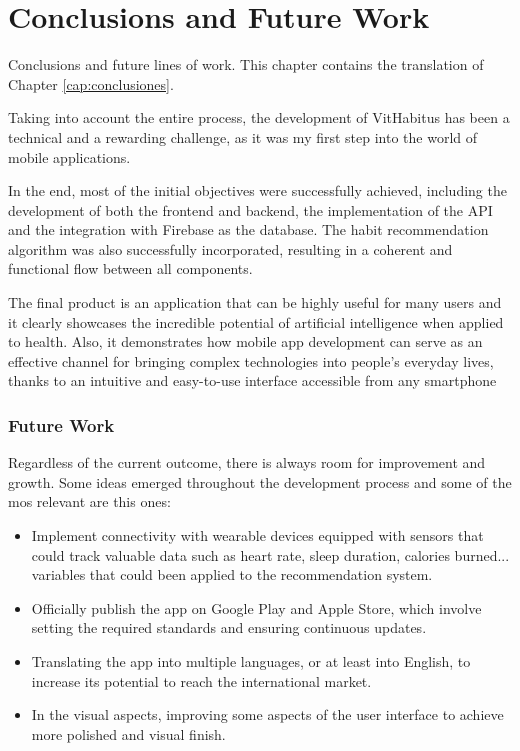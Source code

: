 \chapter*{Conclusions and Future Work}
\label{cap:conclusions}

Conclusions and future lines of work. This chapter contains the translation of Chapter \ref{cap:conclusiones}.

Taking into account the entire process, the development of VitHabitus has been a technical and a rewarding challenge, as it was my first step into the world of mobile applications.

In the end, most of the initial objectives were successfully achieved, including the development of both the frontend and backend, the implementation of the API and the integration with Firebase as the database. The habit recommendation algorithm was also successfully incorporated, resulting in a coherent and functional flow between all components.

The final product is an application that can be highly useful for many users and it clearly showcases the incredible potential of artificial intelligence when applied to health. Also, it demonstrates how mobile app development can serve as an effective channel for bringing complex technologies into people's everyday lives, thanks to an intuitive and easy-to-use interface accessible from any smartphone

\subsection*{Future Work}

Regardless of the current outcome, there is always room for improvement and growth.
Some ideas emerged throughout the development process and some of the mos relevant are this ones:
\begin{itemize}
    \item Implement connectivity with wearable devices equipped with sensors that could track valuable data such as heart rate, sleep duration, calories burned... variables that could been applied to the recommendation system.
    \item Officially publish the app on Google Play and Apple Store, which involve setting the required standards and ensuring continuous updates.
    \item Translating the app into multiple languages, or at least into English, to increase its potential to reach the international market.
    \item In the visual aspects, improving some aspects of the user interface to achieve more polished and visual finish.
\end{itemize}

